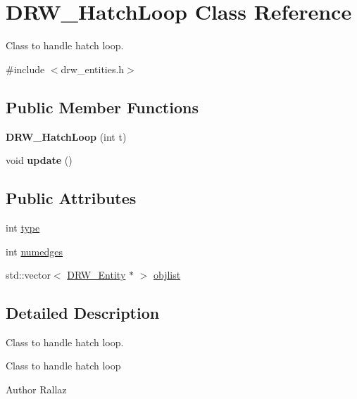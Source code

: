 \hypertarget{classDRW__HatchLoop}{\section{D\-R\-W\-\_\-\-Hatch\-Loop Class Reference}
\label{classDRW__HatchLoop}
}


Class to handle hatch loop.  




{\ttfamily \#include $<$drw\-\_\-entities.\-h$>$}

\subsection*{Public Member Functions}
\begin{DoxyCompactItemize}
\item 
\hypertarget{classDRW__HatchLoop_a5c25ca30a1419b94037dc6e03ced3fd0}{{\bfseries D\-R\-W\-\_\-\-Hatch\-Loop} (int t)}\label{classDRW__HatchLoop_a5c25ca30a1419b94037dc6e03ced3fd0}

\item 
\hypertarget{classDRW__HatchLoop_a4ab744e421ded6c530750adbede58d93}{void {\bfseries update} ()}\label{classDRW__HatchLoop_a4ab744e421ded6c530750adbede58d93}

\end{DoxyCompactItemize}
\subsection*{Public Attributes}
\begin{DoxyCompactItemize}
\item 
int \hyperlink{classDRW__HatchLoop_a5891fcfa111b70221bc04c629bd6286d}{type}
\item 
int \hyperlink{classDRW__HatchLoop_a48586ffbf48389a849e47c7d2412a280}{numedges}
\item 
std\-::vector$<$ \hyperlink{classDRW__Entity}{D\-R\-W\-\_\-\-Entity} $\ast$ $>$ \hyperlink{classDRW__HatchLoop_afbd7d0876386234348fa0a301051d601}{objlist}
\end{DoxyCompactItemize}


\subsection{Detailed Description}
Class to handle hatch loop. 

Class to handle hatch loop \begin{DoxyAuthor}{Author}
Rallaz 
\end{DoxyAuthor}


